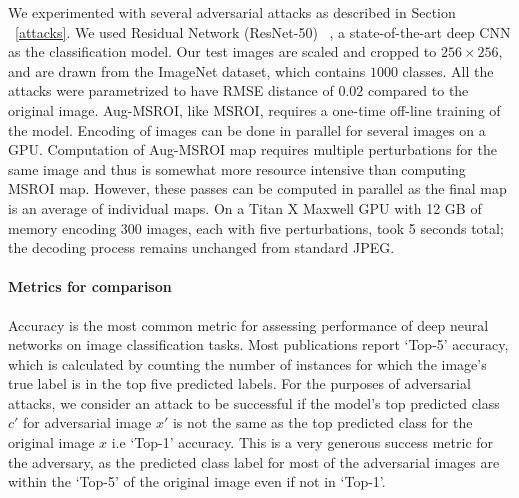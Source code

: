 We experimented with several adversarial attacks as described in Section ~\ref{attacks}.
We used Residual Network (ResNet-50) ~\cite{He2016DeepRL}, a state-of-the-art deep CNN as the classification model. 
Our test images are scaled and cropped to $256 \times 256$, and are drawn from the ImageNet dataset, which contains $1000$ classes.
All the attacks were parametrized to have RMSE distance of $0.02$ compared to the original image.
Aug-MSROI, like MSROI, requires a one-time off-line training of the model. Encoding of images can be done in parallel for several images on a GPU. Computation of Aug-MSROI map requires multiple perturbations for the same image and thus is somewhat more resource intensive than computing MSROI map. However, these passes can be computed in parallel as the final map is an average of individual maps. On a Titan X Maxwell GPU with 12 GB of memory encoding 300 images, each with five perturbations, took 5 seconds total; the decoding process remains unchanged from standard JPEG.

\paragraph{Metrics for comparison} Accuracy is the most common metric for assessing performance of deep neural networks on image classification tasks.
Most publications report `Top-5' accuracy, which is calculated by counting the number of instances for which the image's true label is in the top five predicted labels. 
For the purposes of adversarial attacks, we consider an attack to be successful if the model's top predicted class $c'$ for adversarial image $x'$ is not the same as the top predicted class for the original image $x$ i.e `Top-1' accuracy. 
This is a very generous success metric for the adversary, as the predicted class label for most of the adversarial images are within the `Top-5' of the original image even if not in `Top-1'.

